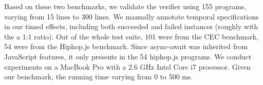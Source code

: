 \documentclass[acmsmall,10pt,review]{acmart}
\newcommand{\timedEffects}{\emph{TimEffs}}
\begin{document}



   

Based on these two benchmarks, we validate the verifier using 155  programs, varying from 15 lines to 300 lines. We manually annotate temporal specifications in our timed effects, including both succeeded and failed instances (roughly with the a 1:1 ratio). 
Out of the whole test suite, 101 were from the CEC benchmark, 54 were from the Hiphop.js benchmark.  Since async-await was inherited from JavaScript features, it only presents in the 54 hiphop.js programs.
We conduct experiments on a MacBook Pro with a 2.6 GHz Intel Core i7 processor. Given our benchmark, the running time varying from 0 to 500 ms. 

\end{document}
